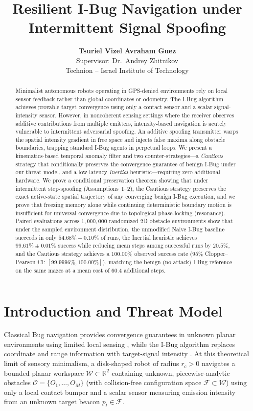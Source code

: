 \documentclass[10pt, a4paper, twocolumn]{article}
\title{\vspace{-1.2em}\Large\textbf{Resilient I-Bug Navigation under Intermittent Signal Spoofing}}
\author{
  \textbf{Tsuriel Vizel} \quad \textbf{Avraham Guez} \\
  \small Supervisor: Dr.\ Andrey Zhitnikov \\
  \small Technion -- Israel Institute of Technology \\
  \vspace{-1.2em}
}
\date{}
\begin{document}
\maketitle

\begin{abstract}
\noindent
Minimalist autonomous robots operating in GPS-denied environments rely on local sensor feedback rather than global coordinates or odometry. The I-Bug algorithm achieves provable target convergence using only a contact sensor and a scalar signal-intensity sensor. However, in noncoherent sensing settings where the receiver observes additive contributions from multiple emitters, intensity-based navigation is acutely vulnerable to intermittent adversarial spoofing. An additive spoofing transmitter warps the spatial intensity gradient in free space and injects false maxima along obstacle boundaries, trapping standard I-Bug agents in perpetual loops. We present a kinematics-based temporal anomaly filter and two counter-strategies—a \textit{Cautious} strategy that conditionally preserves the convergence guarantee of benign I-Bug under our threat model, and a low-latency \textit{Inertial} heuristic—requiring zero additional hardware. We prove a conditional preservation theorem showing that under intermittent step-spoofing (Assumptions~1--2), the Cautious strategy preserves the exact active-state spatial trajectory of any converging benign I-Bug execution, and we prove that freezing memory alone while continuing deterministic boundary motion is insufficient for universal convergence due to topological phase-locking (resonance). Paired evaluations across $1,000,000$ randomized 2D obstacle environments show that under the sampled environment distribution, the unmodified Naive I-Bug baseline succeeds in only $54.68\% \pm 0.10\%$ of runs, the Inertial heuristic achieves $99.61\% \pm 0.01\%$ success while reducing mean steps among successful runs by $20.5\%$, and the Cautious strategy achieves a $100.00\%$ observed success rate ($95\%$ Clopper--Pearson CI: $[99.9996\%, 100.00\%]$), matching the benign (no-attack) I-Bug reference on the same mazes at a mean cost of $60.4$ additional steps.
\end{abstract}

\section{Introduction and Threat Model}
Classical Bug navigation provides convergence guarantees in unknown planar environments using limited local sensing \cite{lumelsky1987path, kamon1998tangentbug}, while the I-Bug algorithm replaces coordinate and range information with target-signal intensity \cite{taylor2009ibug, taylor2014intensity}. At this theoretical limit of sensory minimalism, a disk-shaped robot of radius $r_c > 0$ navigates a bounded planar workspace $\mathcal{W} \subset \mathbb{R}^2$ containing unknown, piecewise-analytic obstacles $\mathcal{O} = \{O_1, \dots, O_M\}$ (with collision-free configuration space $\mathcal{F} \subset \mathcal{W}$) using only a local contact bumper and a scalar sensor measuring emission intensity from an unknown target beacon $p_t \in \mathcal{F}$.
\end{document}
